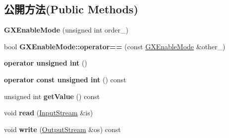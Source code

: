 \subsection*{公開方法(Public Methods)}
\begin{DoxyCompactItemize}
\item 
{\bfseries G\+X\+Enable\+Mode} (unsigned int order\+\_)\hypertarget{class_i_dream_sky_1_1_g_x_enable_mode_a814a0e1aec85025a011f79b535117cdd}{}\label{class_i_dream_sky_1_1_g_x_enable_mode_a814a0e1aec85025a011f79b535117cdd}

\item 
bool {\bfseries G\+X\+Enable\+Mode\+::operator==} (const \hyperlink{class_i_dream_sky_1_1_g_x_enable_mode}{G\+X\+Enable\+Mode} \&other\+\_\+)\hypertarget{class_i_dream_sky_1_1_g_x_enable_mode_a477ffbf9350d4549c95085f59f208c9d}{}\label{class_i_dream_sky_1_1_g_x_enable_mode_a477ffbf9350d4549c95085f59f208c9d}

\item 
{\bfseries operator unsigned int} ()\hypertarget{class_i_dream_sky_1_1_g_x_enable_mode_aa149505333627056ab1898d5b9293a54}{}\label{class_i_dream_sky_1_1_g_x_enable_mode_aa149505333627056ab1898d5b9293a54}

\item 
{\bfseries operator const unsigned int} () const \hypertarget{class_i_dream_sky_1_1_g_x_enable_mode_ad3fbcd1b2e2b06587638905cdb082f5b}{}\label{class_i_dream_sky_1_1_g_x_enable_mode_ad3fbcd1b2e2b06587638905cdb082f5b}

\item 
unsigned int {\bfseries get\+Value} () const \hypertarget{class_i_dream_sky_1_1_g_x_enable_mode_a11c457f85d4678400212dd2de8e6f98c}{}\label{class_i_dream_sky_1_1_g_x_enable_mode_a11c457f85d4678400212dd2de8e6f98c}

\item 
void {\bfseries read} (\hyperlink{class_i_dream_sky_1_1_input_stream}{Input\+Stream} \&is)\hypertarget{class_i_dream_sky_1_1_g_x_enable_mode_a7801aedc2bf63f42be684eb10c1e02b8}{}\label{class_i_dream_sky_1_1_g_x_enable_mode_a7801aedc2bf63f42be684eb10c1e02b8}

\item 
void {\bfseries write} (\hyperlink{class_i_dream_sky_1_1_output_stream}{Output\+Stream} \&os) const \hypertarget{class_i_dream_sky_1_1_g_x_enable_mode_a651a971f00640f908c533dde09230ba1}{}\label{class_i_dream_sky_1_1_g_x_enable_mode_a651a971f00640f908c533dde09230ba1}

\end{DoxyCompactItemize}


